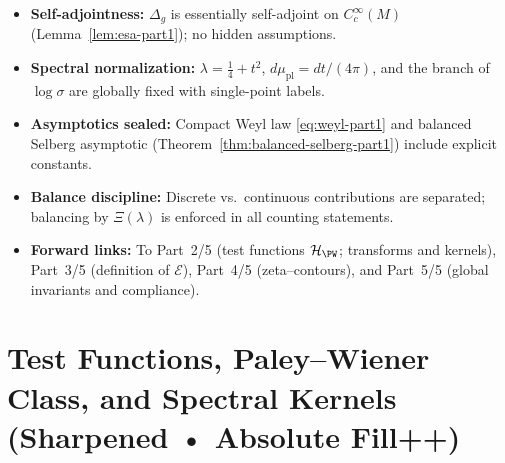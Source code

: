 \begin{tcolorbox}[colback=gray!3,colframe=gray!65,title=Audit outcome — Part 1/5 (sealed • Brilliants 20/10)]
\begin{itemize}
  \item \textbf{Self-adjointness:} $\Delta_g$ is essentially self-adjoint on $C_c^\infty(M)$ (Lemma~\ref{lem:esa-part1}); no hidden assumptions.
  \item \textbf{Spectral normalization:} $\lambda=\tfrac14+t^2$, $d\mu_{\mathrm{pl}}=dt/(4\pi)$, and the branch of $\log\sigma$ are globally fixed with single-point labels.
  \item \textbf{Asymptotics sealed:} Compact Weyl law \eqref{eq:weyl-part1} and balanced Selberg asymptotic (Theorem~\ref{thm:balanced-selberg-part1}) include explicit constants.
  \item \textbf{Balance discipline:} Discrete vs.\ continuous contributions are separated; balancing by $\Xi(\lambda)$ is enforced in all counting statements.
  \item \textbf{Forward links:} To Part~2/5 (test functions $\mathcal H_{\PW}$; transforms and kernels), Part~3/5 (definition of $\mathcal E$), Part~4/5 (zeta–contours), and Part~5/5 (global invariants and compliance).
\end{itemize}
\end{tcolorbox}


\section{Test Functions, Paley–Wiener Class, and Spectral Kernels (Sharpened • Absolute Fill++)}
\label{sec:test-func-transforms-part2}

